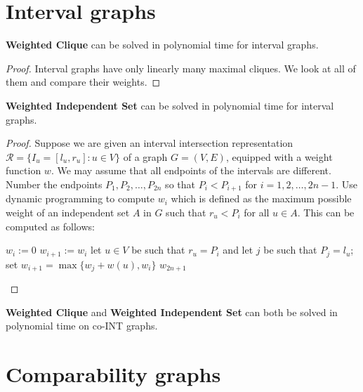\section{Interval graphs}

\begin{thm}
	\textbf{Weighted Clique} can be solved in polynomial time for interval graphs.
\end{thm}

\begin{proof}
	Interval graphs have only linearly many maximal cliques. We look at all of them and compare
	their weights.
\end{proof}

\begin{thm}
	\textbf{Weighted Independent Set} can be solved in polynomial time for interval graphs.
\end{thm}

\begin{proof}
	Suppose we are given an interval intersection representation $\mathcal{R} = \{I_u = [l_u , r_u] : u \in V\}$ of	a graph $G = (V, E)$, equipped with a weight function $w$. We may assume that all endpoints of the intervals are different. Number the endpoints $P_1 , P_2 , \dots , P_{2n}$ so that $P_i < P_{i+1}$ for $i = 1, 2, \dots , 2n - 1$.	Use dynamic programming to compute $w_i$ which is defined as the maximum possible weight of an	independent set $A$ in $G$ such that $r_u < P_i$ for all $u \in A$. This can be computed as follows:
	
	\begin{algorithm}[!ht]
		\begin{algorithmic}[1]
			\State $w_i := 0$
					\State $w_{i+1} := w_i$
				\Else
					\State let $u \in V$ be such that $r_u = P_i$ and let $j$ be such that $P_j = l_u$;
					\State set $w_{i+1} = \max \{w_j + w(u), w_i\}$
				\EndIf
			\EndFor
			\State \Return $w_{2n+1}$
		\end{algorithmic}
	\end{algorithm}
\end{proof}

\begin{cor}
	\textbf{Weighted Clique} and \textbf{Weighted Independent Set} can both be solved in polynomial	time on co-INT graphs.
\end{cor}

\section{Comparability graphs}

